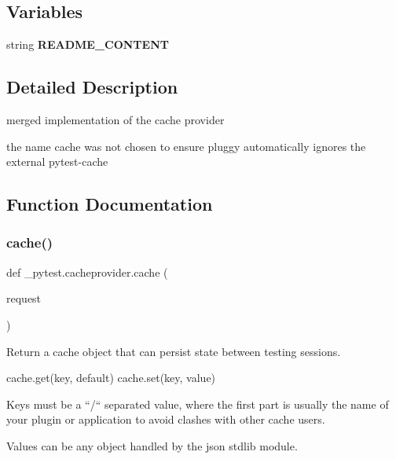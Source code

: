 \subsection*{Variables}
\begin{DoxyCompactItemize}
\item 
string {\bfseries R\+E\+A\+D\+M\+E\+\_\+\+C\+O\+N\+T\+E\+NT}
\end{DoxyCompactItemize}


\subsection{Detailed Description}
\begin{DoxyVerb}merged implementation of the cache provider

the name cache was not chosen to ensure pluggy automatically
ignores the external pytest-cache
\end{DoxyVerb}
 

\subsection{Function Documentation}
\mbox{\label{namespace__pytest_1_1cacheprovider_af7069bb3796bc249738fb0b0adea69ad}} 
\subsubsection{\texorpdfstring{cache()}{cache()}}
{\footnotesize\ttfamily def \+\_\+pytest.\+cacheprovider.\+cache (\begin{DoxyParamCaption}\item[{}]{request }\end{DoxyParamCaption})}

\begin{DoxyVerb}Return a cache object that can persist state between testing sessions.

cache.get(key, default)
cache.set(key, value)

Keys must be a ``/`` separated value, where the first part is usually the
name of your plugin or application to avoid clashes with other cache users.

Values can be any object handled by the json stdlib module.
\end{DoxyVerb}
 

